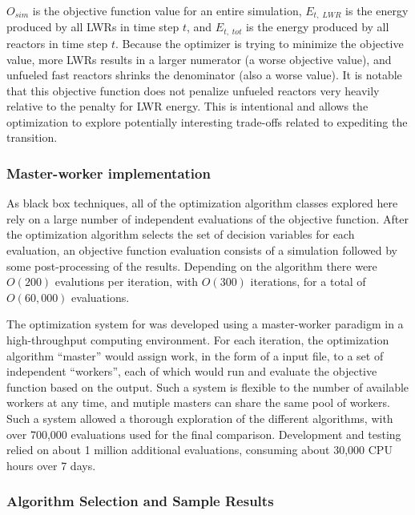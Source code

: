 $O_{sim}$ is the objective function value for an entire simulation,
$E_{t,\;LWR}$ is the energy produced by all \gls{LWR}s in time step $t$, and
$E_{t,\;tot}$ is the energy produced by all reactors in time step $t$.
Because the optimizer is trying to minimize the objective value, more
\gls{LWR}s results in a larger numerator (a worse objective value), and
unfueled fast reactors shrinks the denominator (also a worse value).  It is
notable that this objective function does not penalize unfueled reactors very
heavily relative to the penalty for \gls{LWR} energy.  This is intentional and
allows the optimization to explore potentially interesting trade-offs related
to expediting the transition.


\subsubsection{Master-worker implementation}

As black box techniques, all of the optimization algorithm classes explored
here rely on a large number of independent evaluations of the objective
function.  After the optimization algorithm selects the set of decision
variables for each evaluation, an objective function evaluation consists of a
\Cyclus{} simulation followed by some post-processing of the results.
Depending on the algorithm there were $O(200)$ evalutions per iteration, with
$O(300)$ iterations, for a total of $O(60,000)$ evaluations.  

The optimization system for \Cyclus{} was developed using a master-worker
paradigm in a high-throughput computing environment.  For each iteration, the
optimization algorithm ``master'' would assign work, in the form of a
\Cyclus{} input file, to a set of independent ``workers'', each of which would
run \Cyclus{} and evaluate the objective function based on the output.  Such a
system is flexible to the number of available workers at any time, and mutiple
masters can share the same pool of workers.  Such a system allowed a thorough
exploration of the different algorithms, with over 700,000 \Cyclus{}
evaluations used for the final comparison.  Development and testing relied on
about 1 million additional \Cyclus{} evaluations, consuming about 30,000 CPU
hours over 7 days.

\subsubsection{Algorithm Selection and Sample Results}

